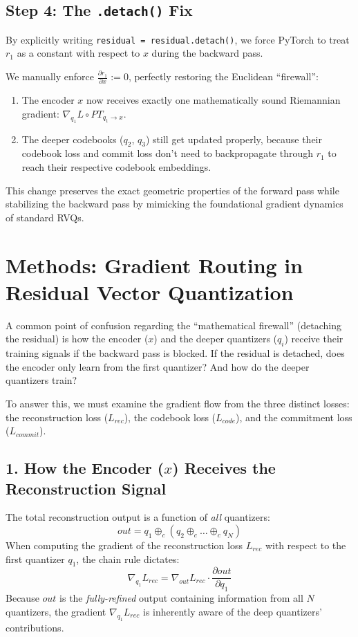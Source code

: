 \documentclass{article}
\begin{document}
\subsection*{Step 4: The \texttt{.detach()} Fix}
By explicitly writing \texttt{residual = residual.detach()}, we force PyTorch to treat $r_1$ as a constant with respect to $x$ during the backward pass. 

We manually enforce $\frac{\partial r_1}{\partial x} := 0$, perfectly restoring the Euclidean ``firewall'':
\begin{enumerate}
    \item The encoder $x$ now receives exactly one mathematically sound Riemannian gradient: $\nabla_{q_1} L \circ PT_{q_1 \to x}$.
    \item The deeper codebooks ($q_2$, $q_3$) still get updated properly, because their codebook loss and commit loss don't need to backpropagate through $r_1$ to reach their respective codebook embeddings.
\end{enumerate}
This change preserves the exact geometric properties of the forward pass while stabilizing the backward pass by mimicking the foundational gradient dynamics of standard RVQs.

\section*{Methods: Gradient Routing in Residual Vector Quantization}

A common point of confusion regarding the ``mathematical firewall'' (detaching the residual) is how the encoder ($x$) and the deeper quantizers ($q_i$) receive their training signals if the backward pass is blocked. If the residual is detached, does the encoder only learn from the first quantizer? And how do the deeper quantizers train? 

To answer this, we must examine the gradient flow from the three distinct losses: the reconstruction loss ($L_{rec}$), the codebook loss ($L_{code}$), and the commitment loss ($L_{commit}$).

\subsection*{1. How the Encoder ($x$) Receives the Reconstruction Signal}
The total reconstruction output is a function of \textit{all} quantizers:
\begin{equation}
    out = q_1 \oplus_c (q_2 \oplus_c \dots \oplus_c q_N)
\end{equation}
When computing the gradient of the reconstruction loss $L_{rec}$ with respect to the first quantizer $q_1$, the chain rule dictates:
\begin{equation}
    \nabla_{q_1} L_{rec} = \nabla_{out} L_{rec} \cdot \frac{\partial out}{\partial q_1}
\end{equation}
Because $out$ is the \textit{fully-refined} output containing information from all $N$ quantizers, the gradient $\nabla_{q_1} L_{rec}$ is inherently aware of the deep quantizers' contributions. 
\end{document}
